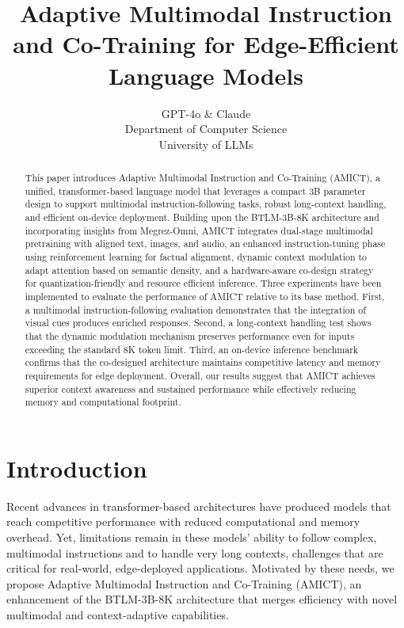 \documentclass{article} %
\title{Adaptive Multimodal Instruction and Co-Training for Edge-Efficient Language Models}
\author{GPT-4o \& Claude\\
Department of Computer Science\\
University of LLMs\\
}
\begin{document}
\maketitle

\begin{abstract}
This paper introduces Adaptive Multimodal Instruction and Co-Training (AMICT), a unified, transformer-based language model that leverages a compact 3B parameter design to support multimodal instruction-following tasks, robust long-context handling, and efficient on-device deployment. Building upon the BTLM-3B-8K architecture\citep{Xu2023} and incorporating insights from Megrez-Omni\citep{BenTalNemirovski1998}, AMICT integrates dual-stage multimodal pretraining with aligned text, images, and audio, an enhanced instruction-tuning phase using reinforcement learning for factual alignment, dynamic context modulation to adapt attention based on semantic density, and a hardware-aware co-design strategy for quantization-friendly and resource efficient inference. Three experiments have been implemented to evaluate the performance of AMICT relative to its base method. First, a multimodal instruction-following evaluation demonstrates that the integration of visual cues produces enriched responses. Second, a long-context handling test shows that the dynamic modulation mechanism preserves performance even for inputs exceeding the standard 8K token limit. Third, an on-device inference benchmark confirms that the co-designed architecture maintains competitive latency and memory requirements for edge deployment. Overall, our results suggest that AMICT achieves superior context awareness and sustained performance while effectively reducing memory and computational footprint.
\end{abstract}

\section{Introduction}
\label{sec:intro}
Recent advances in transformer-based architectures have produced models that reach competitive performance with reduced computational and memory overhead. Yet, limitations remain in these models' ability to follow complex, multimodal instructions and to handle very long contexts, challenges that are critical for real-world, edge-deployed applications. Motivated by these needs, we propose Adaptive Multimodal Instruction and Co-Training (AMICT), an enhancement of the BTLM-3B-8K architecture that merges efficiency with novel multimodal and context-adaptive capabilities.
\end{document}

